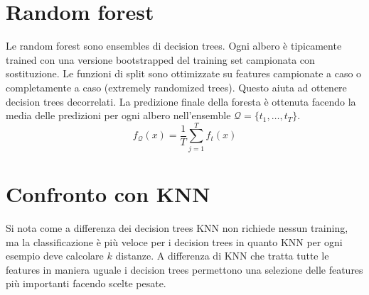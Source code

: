 \section{Random forest}
Le random forest sono ensembles di decision trees.
Ogni albero \`e tipicamente trained con una versione bootstrapped del training set campionata con sostituzione.
Le funzioni di split sono ottimizzate su features campionate a caso o completamente a caso (extremely randomized trees).
Questo aiuta ad ottenere decision trees decorrelati.
La predizione finale della foresta \`e ottenuta facendo la media delle predizioni per ogni albero nell'ensemble $\mathcal{Q}=\{t_1,\dots,t_T\}$.
$$f_\mathcal{Q}(x)=\dfrac{1}{T}\sum\limits_{j=1}^Tf_t(x)$$

\section{Confronto con KNN}
Si nota come a differenza dei decision trees KNN non richiede nessun training, ma la classificazione \`e pi\`u veloce per i decision trees in quanto KNN per ogni esempio deve calcolare $k$ distanze.
A differenza di KNN che tratta tutte le features in maniera uguale i decision trees permettono una selezione delle features pi\`u importanti facendo scelte pesate.
